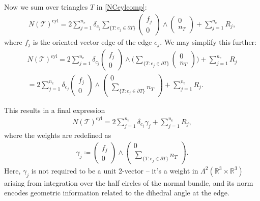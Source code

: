 \documentclass[sn-mathphys-num]{sn-jnl}%
\theoremstyle{thmstyleone}%
\theoremstyle{thmstyletwo}%
\theoremstyle{thmstylethree}%
\numberwithin{remark}{section}
\numberwithin{definition}{section}
\numberwithin{equation}{section}
\numberwithin{theorem}{section}
\begin{document}
Now we sum over triangles $T$ in \cref{NCcylcomp}:
\begin{align*}
 N(\mathcal{T})^{\mathrm{cyl}}
     = 2\sum_{j=1}^{n_{e}}{\delta_{c_{j}}\sum_{\{T\colon e_j\in \partial T\}}{
			\begin{pmatrix}  f_{j} \\ 0  \end{pmatrix}\wedge  \begin{pmatrix} 0\\  n_{T } \end{pmatrix}} }+\sum_{j=1}^{n_e} R_j,
\end{align*}%
where $f_{j}$ is the oriented vector edge of the edge $e_j$. 
We may simplify this further:
\begin{align*}
 N(\mathcal{T})^{\mathrm{cyl}}
     = 2\sum_{j=1}^{n_{e}}{\delta_{c_{j}}\begin{pmatrix}  f_{j} \\ 0  \end{pmatrix} \wedge \bigg(\sum_{\{T\colon e_j\in \partial T\} }{\begin{pmatrix} 0\\  n_{T}  \end{pmatrix}}\bigg) }+\sum_{j=1}^{n_e} R_j\\
     =2\sum_{j=1}^{n_{e}}{\delta_{c_{j}}\begin{pmatrix}  f_{j} \\ 0  \end{pmatrix} \wedge {\begin{pmatrix} 0\\  \sum_{\{T\colon e_j \in \partial T\}} n_{T } \end{pmatrix}} }+\sum_{j=1}^{n_e} R_j.
\end{align*}

This results in a final expression
\begin{align*}
 N(\mathcal{T})^{\mathrm{cyl}}
     = 2\sum_{j=1}^{n_{e}}{\delta_{c_{j}}\gamma_{j} }+\sum_{j=1}^{n_e} R_j,
\end{align*}
where the weights are redefined as
\begin{align}\label{gammadef}
     \gamma_{j}\coloneq 
     \begin{pmatrix}  f_{j} \\ 0  \end{pmatrix} 
     \wedge 
      \begin{pmatrix} 0\\ 
        \sum_{\{T\colon e_j \in \partial T\}}
          n_{T } \end{pmatrix} .
\end{align}
Here, $\gamma_j$ is not required to be a unit 2-vector -- it's a weight in $\Lambda^2(\mathbb{R}^3 \times \mathbb{R}^3)$ arising from integration over the half circles of the normal bundle, and its norm encodes geometric information related to the dihedral angle at the edge. 
\end{document}
